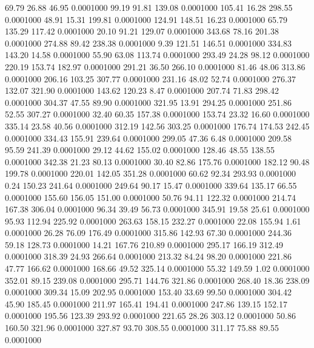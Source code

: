   69.79   26.88   46.95   0.0001000
  99.19   91.81  139.08   0.0001000
 105.41   16.28  298.55   0.0001000
  48.91   15.31  199.81   0.0001000
 124.91  148.51   16.23   0.0001000
  65.79  135.29  117.42   0.0001000
  20.10   91.21  129.07   0.0001000
 343.68   78.16  201.38   0.0001000
 274.88   89.42  238.38   0.0001000
   9.39  121.51  146.51   0.0001000
 334.83  143.20   14.58   0.0001000
  55.90   63.08  113.74   0.0001000
 293.49   24.28   98.12   0.0001000
 220.19  153.74  182.97   0.0001000
 291.21   36.50  266.10   0.0001000
  81.46   48.06  313.86   0.0001000
 206.16  103.25  307.77   0.0001000
 231.16   48.02   52.74   0.0001000
 276.37  132.07  321.90   0.0001000
 143.62  120.23    8.47   0.0001000
 207.74   71.83  298.42   0.0001000
 304.37   47.55   89.90   0.0001000
 321.95   13.91  294.25   0.0001000
 251.86   52.55  307.27   0.0001000
  32.40   60.35  157.38   0.0001000
 153.74   23.32   16.60   0.0001000
 335.14   23.58   40.56   0.0001000
 312.19  142.56  303.25   0.0001000
 176.74  174.53  242.45   0.0001000
 334.43  155.91  239.64   0.0001000
 299.05   47.36    6.48   0.0001000
 209.58   95.59  241.39   0.0001000
  29.12   44.62  155.02   0.0001000
 128.46   48.55  138.55   0.0001000
 342.38   21.23   80.13   0.0001000
  30.40   82.86  175.76   0.0001000
 182.12   90.48  199.78   0.0001000
 220.01  142.05  351.28   0.0001000
  60.62   92.34  293.93   0.0001000
   0.24  150.23  241.64   0.0001000
 249.64   90.17   15.47   0.0001000
 339.64  135.17   66.55   0.0001000
 155.60  156.05  151.00   0.0001000
  50.76   94.11  122.32   0.0001000
 214.74  167.38  306.04   0.0001000
  96.34   39.49   56.73   0.0001000
 345.91   19.58   25.61   0.0001000
  95.93  112.94  225.92   0.0001000
 263.63  158.15  232.27   0.0001000
  22.08  155.94    1.61   0.0001000
  26.28   76.09  176.49   0.0001000
 315.86  142.93   67.30   0.0001000
 244.36   59.18  128.73   0.0001000
  14.21  167.76  210.89   0.0001000
 295.17  166.19  312.49   0.0001000
 318.39   24.93  266.64   0.0001000
 213.32   84.24   98.20   0.0001000
 221.86   47.77  166.62   0.0001000
 168.66   49.52  325.14   0.0001000
  55.32  149.59    1.02   0.0001000
 352.01   89.15  239.08   0.0001000
 295.71  144.76  321.86   0.0001000
 268.40   18.36  238.09   0.0001000
 309.34   15.09  202.95   0.0001000
 153.40   33.69   99.50   0.0001000
 304.42   45.90  185.45   0.0001000
 211.97  165.41  194.41   0.0001000
 247.86  139.15  152.17   0.0001000
 195.56  123.39  293.92   0.0001000
 221.65   28.26  303.12   0.0001000
  50.86  160.50  321.96   0.0001000
 327.87   93.70  308.55   0.0001000
 311.17   75.88   89.55   0.0001000
